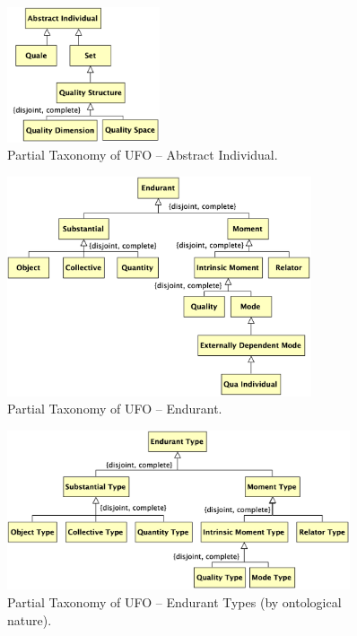\documentclass{article}
\begin{document}
\begin{figure}[ht]
    \centering
    \includegraphics[width=0.4\textwidth]{diagrams/Abstract_Individual_Diagram.png}
    \caption{Partial Taxonomy of UFO -- Abstract Individual.}
    \label{fig:ufo_taxonomy_abstract_individual}
\end{figure}




\begin{figure}[ht]
    \centering
    \includegraphics[width=0.8\textwidth]{diagrams/Endurant_Diagram.png}
    \caption{Partial Taxonomy of UFO -- Endurant.}
    \label{fig:ufo_taxonomy_endurant}
\end{figure}




\begin{figure}[ht]
    \centering
    \includegraphics[width=0.9\textwidth]{diagrams/Endurant_Type_Natures_Diagram.png}
    \caption{Partial Taxonomy of UFO -- Endurant Types (by ontological nature).}
    \label{fig:ufo_taxonomy_endurant_types_natures}
\end{figure}
\end{document}
